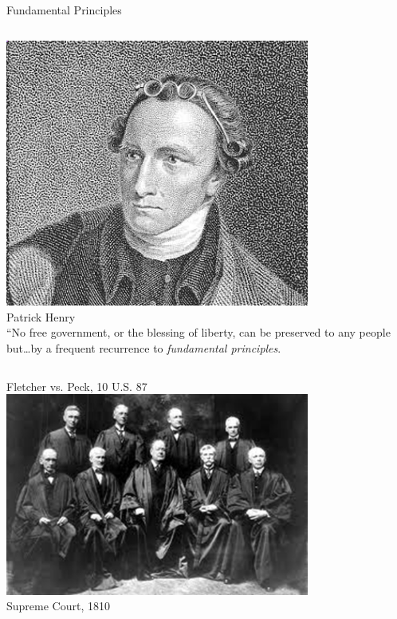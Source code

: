 \begin{frame}{Fundamental Principles}
    \begin{columns}[onlytextwidth]
            \centering
            \includegraphics[width=0.75\textwidth]{img/patrick-henry.png} \\
            Patrick Henry \\

            ``No free government, or the blessing of liberty, can be preserved to any people but\ldots by a frequent recurrence to \emph{fundamental principles}.
    \end{columns}
\end{frame}

\begin{frame}{Fletcher vs. Peck, 10 U.S. 87}
    \centering
    \includegraphics[width=0.75\textwidth]{img/supreme-court-1810.png} \\
    Supreme Court, 1810 \\
\end{frame}

